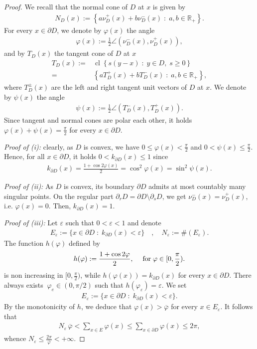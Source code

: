 \documentclass[reqno,11pt]{amsart}
\theoremstyle{definition}
\numberwithin{equation}{section}
\def\e{\varepsilon}
\def\ov{\overline}
\DeclareMathOperator{\cl}{cl}
\newcommand{\RR}{\mathbb{R}}
\newcommand{\tinm}[1]{\text{\;#1\;}}
\newcommand{\1}{{{\bf 1}\kern-0,28em\rm l}}
\def\sepa{\; : \;}
\newcommand{\aco}[1]{\left\{#1\right\}}
\begin{document}
\begin{proof}
We recall that the normal cone of $D$ at $x$ is given by
\begin{align*}
N_{D}(x):=\aco{ a \nu_D^+(x) + b \nu_D^-(x) \sepa a,b \in \RR_+ }.
\end{align*}
For every $x\in \partial D$, we denote by $\varphi(x)$ the angle
\begin{align*}
\varphi(x):= \frac{1}{2}\angle(\nu_D^-(x),\nu_D^+(x)),
\end{align*}
and by $T_D(x)$ the tangent cone of $D$ at $x$
\begin{align*}
T_D(x):= & \cl \aco{ s(y-x) \sepa y\in D,\; s\ge 0 }\\
=& \aco{a T_D^+(x) + b T_D^-(x) \sepa a,b \in \RR_+},
\end{align*}
where $T_D^\pm(x)$ are the left and right tangent unit vectors of $D$ at $x$. We denote by $\psi(x)$ the angle 
\begin{align*}
\psi(x):= \frac{1}{2}\angle (T_D^-(x),T_D^+(x)).
\end{align*} 
Since tangent and normal cones are polar each other, it holds $\varphi(x)+\psi(x) = \frac{\pi}{2}$ for every $x\in \partial D$.


\noindent
\emph{Proof of (i):} clearly, as $D$ is convex, we have 
$ 0\le \varphi(x)< \frac{\pi}{2}$ and  $0< \psi(x)\le \frac{\pi}{2}$.
Hence, for all $x\in\partial D$, it holds $0<k_{\partial D}(x) \le 1$ since
\begin{align*}
k_{\partial D}(x)=\frac{1+\cos 2\varphi(x) }{2} =\cos^2\varphi(x) = \sin^2 \psi(x).
\end{align*}

\noindent
\emph{Proof of (ii):}  As $D$ is convex, its boundary $\partial D$ admits at most countably many singular points. On the regular part $\partial_r D=\partial D\setminus \partial_s D$, we get $\nu_D^-(x)=\nu_D^+(x)$, i.e. $\varphi(x)=0$. Then, $k_{\partial D}(x)=1$.

\medskip
\noindent
\emph{Proof of (iii):} Let $\e$ such that $0<\e<1$ and denote
\begin{align*}
E_\e:=\{ x\in\partial D \sepa k_{\partial D}(x) <\e \}\quad,\quad N_\e:=\#(E_\e) .
\end{align*}
  The function $h(\varphi)$ defined by
\begin{align*}
h(\varphi):=\frac{1+\cos 2\varphi}{2}, \quad \tinm{for} \varphi\in [0,\frac{\pi}{2}).
\end{align*}
 is non increasing in $[0,\frac{\pi}{2})$, while  $h(\varphi(x))=k_{\partial D}(x)$ for every $x\in \partial D$.
There always exists $\ \varphi_e\in (0,\pi/2)$ such that $h(\varphi_\e)=\e$. We set
\begin{align*}
E_\e:=\{ x\in\partial D \sepa k_{\partial D}(x) <\e \}.
\end{align*}
By the monotonicity of $h$, we deduce that  $\varphi(x) > \ov \varphi$ for every $x\in E_\e$.
It follows that
\begin{align*}
N_\e\, \ov\varphi  < \sum_{x\in E}\varphi(x) \le \sum_{x\in\partial D}\varphi(x) \le 2\pi ,
\end{align*}
whence $N_\e \le \frac{2\pi}{ \ov\varphi} <+\infty$.
\end{proof}
\end{document}
